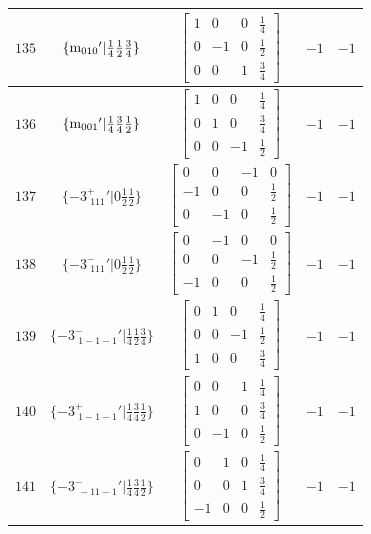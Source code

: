 \documentclass[fleqn,8pt]{jsarticle}
\begin{document}
\begin{longtable}{ccccc}
$ 135 $ & $ \{{\rm m}_{010}{}'|\frac{1}{4} \frac{1}{2} \frac{3}{4}\} $ & $ \begin{bmatrix} 1 & 0 & 0 & \frac{1}{4} \\ 0 & -1 & 0 & \frac{1}{2} \\ 0 & 0 & 1 & \frac{3}{4} \end{bmatrix} $ & $ -1 $ & $ -1 $ \\ \hline
$ 136 $ & $ \{{\rm m}_{001}{}'|\frac{1}{4} \frac{3}{4} \frac{1}{2}\} $ & $ \begin{bmatrix} 1 & 0 & 0 & \frac{1}{4} \\ 0 & 1 & 0 & \frac{3}{4} \\ 0 & 0 & -1 & \frac{1}{2} \end{bmatrix} $ & $ -1 $ & $ -1 $ \\ \hline
$ 137 $ & $ \{-3^{+}_{\,\,111}{}'|0 \frac{1}{2} \frac{1}{2}\} $ & $ \begin{bmatrix} 0 & 0 & -1 & 0 \\ -1 & 0 & 0 & \frac{1}{2} \\ 0 & -1 & 0 & \frac{1}{2} \end{bmatrix} $ & $ -1 $ & $ -1 $ \\ \hline
$ 138 $ & $ \{-3^{-}_{\,\,111}{}'|0 \frac{1}{2} \frac{1}{2}\} $ & $ \begin{bmatrix} 0 & -1 & 0 & 0 \\ 0 & 0 & -1 & \frac{1}{2} \\ -1 & 0 & 0 & \frac{1}{2} \end{bmatrix} $ & $ -1 $ & $ -1 $ \\ \hline
$ 139 $ & $ \{-3^{-}_{\,\,1-1-1}{}'|\frac{1}{4} \frac{1}{2} \frac{3}{4}\} $ & $ \begin{bmatrix} 0 & 1 & 0 & \frac{1}{4} \\ 0 & 0 & -1 & \frac{1}{2} \\ 1 & 0 & 0 & \frac{3}{4} \end{bmatrix} $ & $ -1 $ & $ -1 $ \\ \hline
$ 140 $ & $ \{-3^{+}_{\,\,1-1-1}{}'|\frac{1}{4} \frac{3}{4} \frac{1}{2}\} $ & $ \begin{bmatrix} 0 & 0 & 1 & \frac{1}{4} \\ 1 & 0 & 0 & \frac{3}{4} \\ 0 & -1 & 0 & \frac{1}{2} \end{bmatrix} $ & $ -1 $ & $ -1 $ \\ \hline
$ 141 $ & $ \{-3^{-}_{\,\,-11-1}{}'|\frac{1}{4} \frac{3}{4} \frac{1}{2}\} $ & $ \begin{bmatrix} 0 & 1 & 0 & \frac{1}{4} \\ 0 & 0 & 1 & \frac{3}{4} \\ -1 & 0 & 0 & \frac{1}{2} \end{bmatrix} $ & $ -1 $ & $ -1 $ \\ \hline

\end{longtable}
\end{document}
